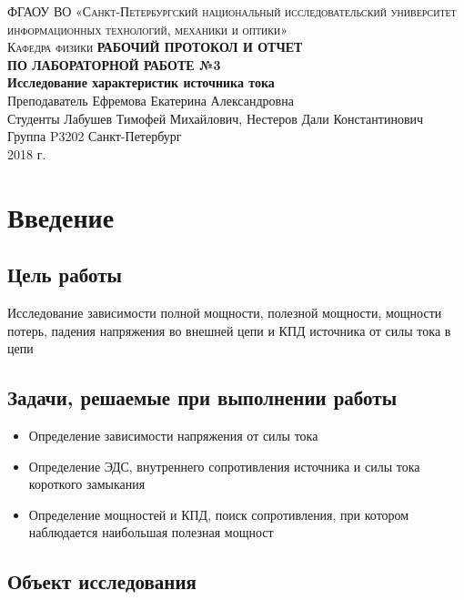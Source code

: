 \documentclass[12pt, a4paper]{article}
\begin{document}
\begin{titlepage}

\noindent\textsc{ФГАОУ ВО «Санкт-Петербургский национальный исследовательский
университет информационных технологий, механики и оптики»\\[4mm]
Кафедра физики}
\vfill
\noindent\textbf{РАБОЧИЙ ПРОТОКОЛ И ОТЧЕТ\\[2mm]
ПО ЛАБОРАТОРНОЙ РАБОТЕ №3\\[4mm]
Исследование характеристик источника тока}\\[16mm]
Преподаватель Ефремова Екатерина Александровна\\[2mm]
Студенты Лабушев Тимофей Михайлович, Нестеров Дали Константинович\\[2mm]
Группа P3202
\vfill
\noindent Санкт-Петербург\\[2mm]
2018 г.

\end{titlepage}

\section*{Введение}

\subsection*{Цель работы}

Исследование зависимости полной мощности, полезной мощности, мощности
потерь, падения напряжения во внешней цепи и КПД источника от силы тока в
цепи

\subsection*{Задачи, решаемые при выполнении работы}

\begin{itemize}
\item Определение зависимости напряжения от силы тока
\item Определение ЭДС, внутреннего сопротивления источника и силы тока короткого замыкания
\item Определение мощностей и КПД, поиск сопротивления, при котором наблюдается наибольшая полезная мощност
\end{itemize}

\subsection*{Объект исследования}
\end{document}
